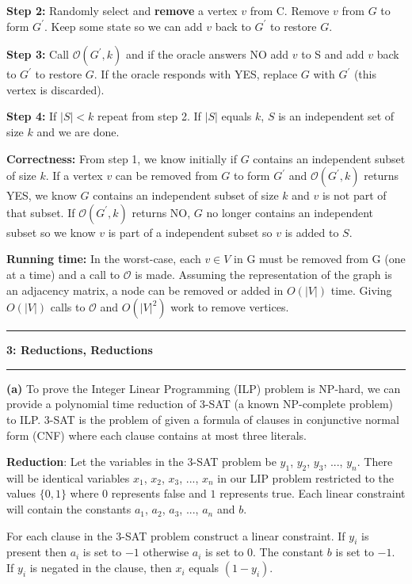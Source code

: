 \documentclass[11pt]{article}
\newcommand\question[2]{\vspace{.25in}\hrule\textbf{#1: #2}\vspace{.5em}\hrule\vspace{.10in}}
\renewcommand\part[1]{\vspace{.10in}\textbf{(#1)}}
\newcommand\correctness{\vspace{.10in}\textbf{Correctness: }}
\newcommand\runtime{\vspace{.10in}\textbf{Running time: }}
\begin{document}
\textbf{Step 2:} Randomly select and \textbf{remove} a vertex $v$ from C. Remove $v$ from $G$ to form $G^\prime$. Keep some state so we can add $v$ back to $G^\prime$ to restore $G$.

\textbf{Step 3:} Call $\mathcal{O}(G^\prime, k)$ and if the oracle answers NO add $v$ to S and add $v$ back to $G^\prime$ to restore $G$. If the oracle responds with YES, replace $G$ with $G^\prime$ (this vertex is discarded).

\textbf{Step 4:} If $|S| < k$ repeat from step 2. If $|S|$ equals $k$, $S$ is an independent set of size $k$ and we are done.

\correctness From step 1, we know initially if $G$ contains an independent subset of size $k$. If a vertex $v$ can be removed from $G$ to form $G^\prime$ and $\mathcal{O}(G^\prime, k)$ returns YES, we know $G$ contains an independent subset of size $k$ and $v$ is not part of that subset. If $\mathcal{O}(G^\prime, k)$ returns NO, $G$ no longer contains an independent subset so we know $v$ is part of a independent subset so $v$ is added to $S$.

\runtime In the worst-case, each $v \in V$ in G must be removed from G (one at a time) and a call to $\mathcal{O}$ is made. Assuming the representation of the graph is an adjacency matrix, a node can be removed or added in $O(|V|)$ time. Giving $O(|V|)$ calls to $\mathcal{O}$ and $O(|V|^2)$ work to remove vertices.

\question{3}{Reductions, Reductions}

\part{a} To prove the Integer Linear Programming (ILP) problem is NP-hard, we can provide a polynomial time reduction of 3-SAT (a known NP-complete problem) to ILP. 3-SAT is the problem of given a formula of clauses in conjunctive normal form (CNF) where each clause contains at most three literals.

\textbf{Reduction}: Let the variables in the 3-SAT problem be $y_1$, $y_2$, $y_3$, ..., $y_n$. There will be identical variables $x_1$, $x_2$, $x_3$, ..., $x_n$ in our LIP problem restricted to the values $\{0, 1\}$ where $0$ represents false and $1$ represents true. Each linear constraint will contain the constants $a_1$, $a_2$, $a_3$, ..., $a_n$ and $b$.

	For each clause in the 3-SAT problem construct a linear constraint. If $y_i$ is present then $a_i$ is set to $-1$ otherwise $a_i$ is set to $0$. The constant $b$ is set to $-1$. If $y_i$ is negated in the clause, then $x_i$ equals $(1 - y_i)$.
	
\end{document}
